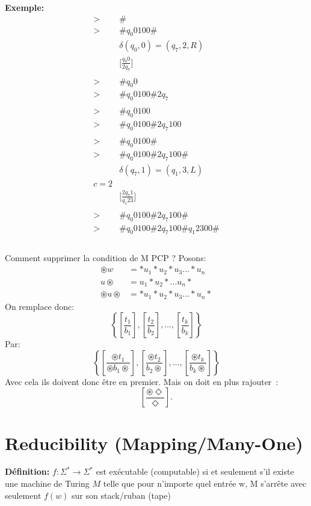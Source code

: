 \documentclass[a4paper,12pt]{article}
\begin{document}
  \textbf{Exemple:}
  \begin{align*}
    > &\#\\
    > &\# q_0 0 1 0 0 \#\\
    &\delta(q_0, 0) = (q_7, 2, R)\\
    &\Big[\frac{q_0 0}{2 q_7}\Big]\\
    &\\
    > &\# q_0 0\\
    > &\# q_0 0 1 0 0 \# 2 q_7\\
    &\\
    > &\# q_0 0 1 0 0\\
    > &\# q_0 0 1 0 0 \# 2 q_7 1 0 0 \\
    &\\
    > &\# q_0 0 1 0 0 \#\\
    > &\# q_0 0 1 0 0 \# 2 q_7 1 0 0 \#\\
    &\delta(q_7, 1) = (q_1, 3, L)\\
    c= 2\\
    &\Big[\frac{2 q_7 1}{q_1 2 3}\Big]\\
    &\\
    > &\# q_0 0 1 0 0 \# 2 q_7 1 0 0 \#\\
    > &\# q_0 0 1 0 0 \# 2 q_7 1 0 0 \# q_1 2 3 0 0 \# \\
    &\\
  \end{align*}

  Comment supprimer la condition de M PCP ?  Posons:
  \begin{align*}
    \circledast w &= * u_1 * u_2 * u_3 ... * u_n\\
    u \circledast &= u_1 * u_2 * ... u_n *\\
    \circledast u \circledast &= * u_1 * u_2 * u_3 ... * u_n *
  \end{align*}
  On remplace donc:
  $$\left\{ \left[\frac{t_1}{b_1}\right] , \left[\frac{t_2}{b_2}\right], \ldots, \left[\frac{t_k}{b_k}\right] \right\}$$
  Par:
  $$\left\{ \left[\frac{\circledast t_1}{\circledast b_1 \circledast}\right], \left[\frac{\circledast t_2}{b_2 \circledast}\right], \ldots,
	\left[\frac{\circledast t_k}{b_k \circledast}\right] \right\}$$
  Avec cela ils doivent donc être en premier.  Mais on doit en plus rajouter~:
  $$\left[ \frac{\circledast \Diamond}{\Diamond} \right].$$


\section{Reducibility (Mapping/Many-One)}
  \textbf{Définition:} $f : \Sigma^* \rightarrow \Sigma^*$ est exécutable (computable) si et seulement s'il existe une machine de Turing $M$ telle que pour n'importe quel entrée w, M s'arrête avec seulement $f(w)$ sur son stack/ruban (tape)\\
\end{document}
